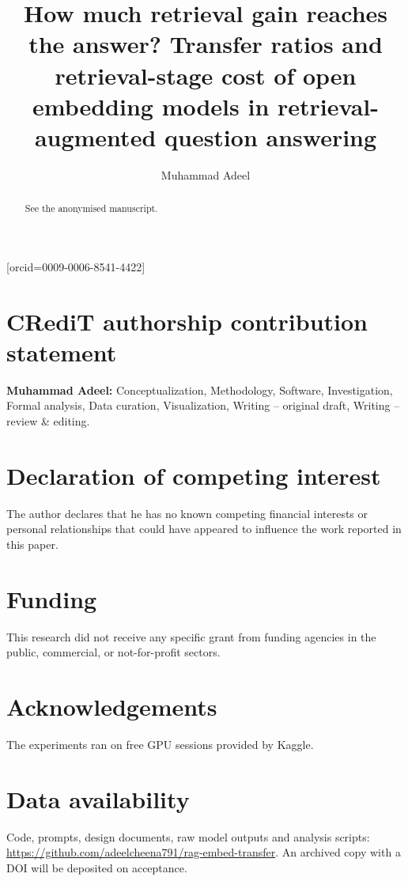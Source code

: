\documentclass[a4paper,fleqn]{cas-sc}
\begin{document}
\let\WriteBookmarks\relax
{}

\title[mode=title]{How much retrieval gain reaches the answer? Transfer ratios and retrieval-stage cost of open embedding models in retrieval-augmented question answering}

\author[1]{Muhammad Adeel}[orcid=0009-0006-8541-4422]
\cormark[1]

\begin{abstract}
See the anonymised manuscript.
\end{abstract}

\maketitle

\section*{CRediT authorship contribution statement}
\textbf{Muhammad Adeel:} Conceptualization, Methodology, Software, Investigation, Formal analysis, Data curation, Visualization, Writing -- original draft, Writing -- review \& editing.

\section*{Declaration of competing interest}
The author declares that he has no known competing financial interests or personal relationships that could have appeared to influence the work reported in this paper.

\section*{Funding}
This research did not receive any specific grant from funding agencies in the public, commercial, or not-for-profit sectors.

\section*{Acknowledgements}
The experiments ran on free GPU sessions provided by Kaggle.

\section*{Data availability}
Code, prompts, design documents, raw model outputs and analysis scripts: \url{https://github.com/adeelcheena791/rag-embed-transfer}. An archived copy with a DOI will be deposited on acceptance.
\end{document}
